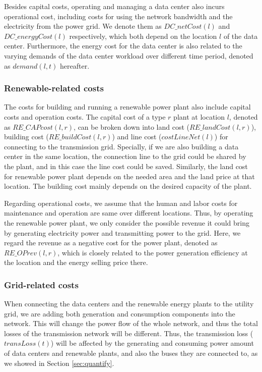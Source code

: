 Besides capital costs, operating and managing a data center also incurs operational cost, including costs for using the network bandwidth and the electricity from the power grid. We denote them as $DC\_netCost(l)$ and $DC\_energyCost(l)$ respectively, which both depend on the location $l$ of the data center. Furthermore, the energy cost for the data center is also related to the varying demands of the data center workload over different time period, denoted as $demand(l,t)$ hereafter.

\subsubsection{Renewable-related costs} The costs for building and running a renewable power plant also include capital costs and operation costs. The capital cost of a type $r$ plant at location $l$, denoted as $RE\_CAPcost(l,r)$, can be broken down into land cost ($RE\_landCost(l,r)$), building cost ($RE\_buildCost(l,r)$) and line cost ($costLineNet(l)$) for connecting to the transmission grid. Specially, if we are also building a data center in the same location, the connection line to the grid could be shared by the plant, and in this case the line cost could be saved. Similarly, the land cost for renewable power plant depends on the needed area and the land price at that location. The building cost mainly depends on the desired capacity of the plant.

Regarding operational costs, we assume that the human and labor costs for maintenance and operation are same over different locations. Thus, by operating the renewable power plant, we only consider the possible revenue it could bring by generating electricity power and transmitting power to the grid. Here, we regard the revenue as a negative cost for the power plant, denoted as $RE\_OPrev(l,r)$, which is closely related to the power generation efficiency at the location and the energy selling price there.

\subsubsection{Grid-related costs} When connecting the data centers and the renewable energy plants to the utility grid, we are adding both generation and consumption components into the network. This will change the power flow of the whole network, and thus the total losses of the transmission network will be different. Thus, the transmission loss ($transLoss(t)$) will be affected by the generating and consuming power amount of data centers and renewable plants, and also the buses they are connected to, as we showed in Section \ref{sec:quantify}.

